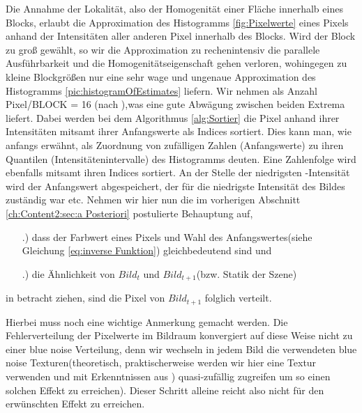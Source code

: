 Die Annahme der Lokalität, also der Homogenität einer Fläche innerhalb eines Blocks, 
erlaubt die Approximation des Histogramms \ref{fig:Pixelwerte} eines Pixels 
anhand der Intensitäten aller anderen Pixel innerhalb des Blocks.
Wird der Block zu groß gewählt, so wir die Approximation zu rechenintensiv die parallele Ausführbarkeit 
und die  Homogenitätseigenschaft gehen verloren, wohingegen 
zu kleine Blockgrößen nur eine sehr wage und ungenaue Approximation des 
Histogramms \ref{pic:histogramOfEstimates} liefern. Wir nehmen als Anzahl Pixel/BLOCK = 16
(nach \cite{hal02158423}),was eine gute Abwägung zwischen beiden Extrema liefert.
Dabei werden bei dem Algorithmus \ref{alg:Sortier} die Pixel anhand ihrer Intensitäten mitsamt 
ihrer Anfangswerte als Indices sortiert. Dies kann man, wie anfangs erwähnt, als Zuordnung 
von zufälligen Zahlen (Anfangswerte) zu ihren Quantilen (Intensitätenintervalle) des Histogramms deuten.
Eine  Zahlenfolge wird ebenfalls mitsamt ihren Indices sortiert.
An der Stelle der niedrigsten -Intensität wird der Anfangswert abgespeichert,
der für die niedrigste Intensität des Bildes zuständig war etc. 
\newpage
Nehmen wir hier nun die im vorherigen Abschnitt \ref{ch:Content2:sec:a Posteriori} postulierte Behauptung 
auf, 

\begin{itemize}
    \item[\uproman{1}.)] dass der Farbwert eines Pixels und Wahl des Anfangswertes(siehe Gleichung 
                        \ref{eq:inverse Funktion}) gleichbedeutend sind und 
    \item[\uproman{2}.)] die Ähnlichkeit von $Bild_{t}$ und $Bild_{t+1}$(bzw. Statik der Szene)
\end{itemize}

in betracht ziehen, sind die Pixel von $Bild_{t+1}$ folglich  
verteilt. 

\par

Hierbei muss noch eine wichtige Anmerkung gemacht werden. Die Fehlerverteilung
der Pixelwerte im Bildraum konvergiert auf diese Weise nicht zu einer 
blue noise Verteilung, denn wir wechseln in jedem Bild die 
verwendeten blue noise Texturen(theoretisch, praktischerweise werden wir hier eine
Textur verwenden und mit Erkenntnissen aus ) 
quasi-zufällig zugreifen um so einen solchen Effekt zu erreichen). 
Dieser Schritt alleine reicht also nicht für den erwünschten Effekt zu erreichen.


